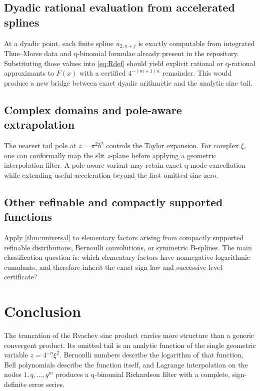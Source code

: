 \documentclass[11pt]{article}
\theoremstyle{definition}
\theoremstyle{remark}
\begin{document}
\subsection{Dyadic rational evaluation from accelerated splines}

At a dyadic point, each finite spline \(u_{2,n+j}\) is exactly computable from
integrated Thue--Morse data and q-binomial formulae already present in the
repository. Substituting those values into \eqref{eq:Rdef} should yield explicit
rational or q-rational approximants to \(F(x)\) with a certified
\(4^{-(m+1)n}\) remainder. This would produce a new bridge between exact dyadic
arithmetic and the analytic sinc tail.

\subsection{Complex domains and pole-aware extrapolation}

The nearest tail pole at \(z=\pi^2b^2\) controls the Taylor expansion. For
complex \(\xi\), one can conformally map the slit \(z\)-plane before applying a
geometric interpolation filter. A pole-aware variant may retain exact q-mode
cancellation while extending useful acceleration beyond the first omitted sinc
zero.

\subsection{Other refinable and compactly supported functions}

Apply \cref{thm:universal} to elementary factors arising from compactly
supported refinable distributions, Bernoulli convolutions, or symmetric
B-splines. The main classification question is: which elementary factors have
nonnegative logarithmic cumulants, and therefore inherit the exact sign law and
successive-level certificate?

\section{Conclusion}

The truncation of the Rvachev sinc product carries more structure than a generic
convergent product. Its omitted tail is an analytic function of the single
geometric variable \(z=4^{-n}\xi^2\). Bernoulli numbers describe the logarithm
of that function, Bell polynomials describe the function itself, and Lagrange
interpolation on the nodes \(1,q,\ldots,q^m\) produces a q-binomial Richardson
filter with a complete, sign-definite error series.
\end{document}

